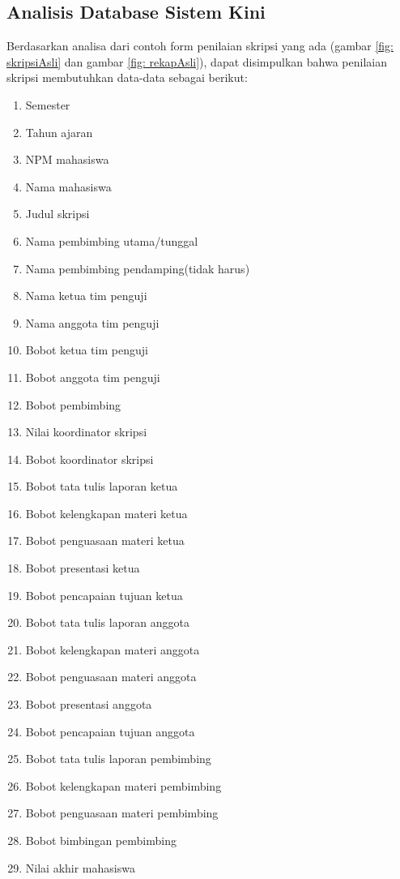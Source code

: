 		
		
	\subsection{Analisis Database Sistem Kini}
	\label{sub: analisisDatabase}
	
	Berdasarkan analisa dari contoh form penilaian skripsi yang ada (gambar \ref{fig: skripsiAsli} dan gambar \ref{fig: rekapAsli}), dapat disimpulkan bahwa penilaian skripsi membutuhkan data-data sebagai berikut:
		
		\begin{enumerate}
			\item Semester
			\item Tahun ajaran
			\item NPM mahasiswa 
			\item Nama mahasiswa
			\item Judul skripsi
			\item Nama pembimbing utama/tunggal
			\item Nama pembimbing pendamping(tidak harus)
			\item Nama ketua tim penguji
			\item Nama anggota tim penguji
			\item Bobot ketua tim penguji
			\item Bobot anggota tim penguji
			\item Bobot pembimbing
			\item Nilai koordinator skripsi
			\item Bobot koordinator skripsi
			\item Bobot tata tulis laporan ketua
			\item Bobot kelengkapan materi ketua
			\item Bobot penguasaan materi ketua
			\item Bobot presentasi ketua
			\item Bobot pencapaian tujuan ketua
			\item Bobot tata tulis laporan anggota
			\item Bobot kelengkapan materi anggota
			\item Bobot penguasaan materi anggota
			\item Bobot presentasi anggota
			\item Bobot pencapaian tujuan anggota
			\item Bobot tata tulis laporan pembimbing
			\item Bobot kelengkapan materi pembimbing
			\item Bobot penguasaan materi pembimbing
			\item Bobot bimbingan pembimbing
			\item Nilai akhir mahasiswa
		\end{enumerate}
	
